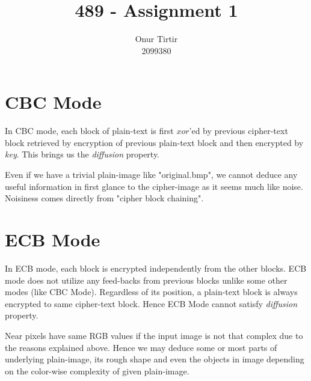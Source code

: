\documentclass[12pt]{article}
\begin{document}
 
\title{489 - Assignment 1}
\author{Onur Tirtir\\2099380}
\maketitle

\section{CBC Mode}
\par
In CBC mode, each block of plain-text is first $xor$'ed by previous cipher-text block 
retrieved by encryption of previous plain-text block and then encrypted by \textit{key}.
This brings us the \textit{diffusion} property.
\par
Even if we have a trivial plain-image like "original.bmp", we cannot deduce any
useful information in first glance to the cipher-image as it seems much like noise.
Noisiness comes directly from "cipher block chaining".

\section{ECB Mode}
\par
In ECB mode, each block is encrypted independently from the other blocks.
ECB mode does not utilize any feed-backs from previous blocks unlike some other
modes (like CBC Mode). Regardless of its position, a plain-text block 
is always encrypted to same cipher-text block. Hence ECB Mode cannot
satisfy \textit{diffusion} property.
\par
Near pixels have same RGB values if the input image is not that complex
due to the reasons explained above.
Hence we may deduce some or most parts of underlying plain-image, its rough shape and 
even the objects in image depending on the 
color-wise complexity of given plain-image.
\end{document}
